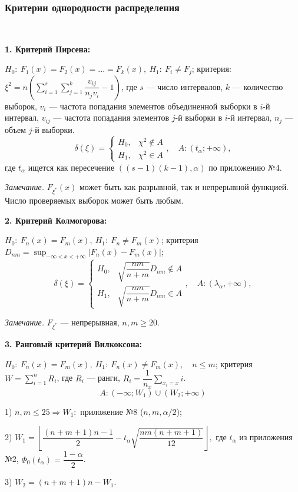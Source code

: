 \documentclass[9pt]{article}
\begin{document}
\subsubsection{Критерии однородности распределения}

\ 
\par\textbf{1. Критерий Пирсена:}
\par\(H_0:\ F_1(x)=F_2(x)=...=F_k(x),\ H_1:\ F_i\neq F_j\);
 критерия: \(\xi^2=n\left(\displaystyle\sum_{i=1}^s\sum_{j=1}^k\dfrac{v_{ij}}{n_jv_i}-1\right)\), где \(s\) --- число интервалов, \(k\) --- количество выборок, \(v_i\) --- частота попадания элементов объединенной выборки в \(i\)-й интервал, \(v_{ij}\) --- частота попадания элементов \(j\)-й выборки в \(i\)-й интервал, \(n_j\) --- объем \(j\)-й выборки.
\[\delta(\xi)=\left\{\begin{array}{ll}
    H_0, & \chi^2\notin A \\
    H_1, & \chi^2\in A
\end{array}\right.,\quad A:(t_\alpha;+\infty),\]
где \(t_\alpha\) ищется как пересечение \(((s-1)(k-1),\alpha)\) по приложению №4.
\par\textit{Замечание.} \(F_{\xi^*}(x)\) может быть как разрывной, так и непрерывной функцией. Число проверяемых выборок может быть любым.
\par\textbf{2. Критерий Колмогорова:}
\par\(H_0:\ F_n(x)=F_m(x),\ H_1:\ F_n\neq F_m(x)\);
 критерия \(D_{nm}=\displaystyle\sup_{-\infty<x<+\infty}|F_n(x)-F_m(x)|\);
\[\delta(\xi)=\left\{\begin{array}{ll}
    H_0, & \sqrt{\dfrac{nm}{n+m}}D_{nm}\notin A \\
    H_1, & \sqrt{\dfrac{nm}{n+m}}D_{nm}\in A
\end{array}
\right.,\quad A:(\lambda_\alpha,+\infty),\]
\par\textit{Замечание.} \(F_{\xi^*}\) --- непрерывная, \(n,m\ge20\).
\par\textbf{3. Ранговый критерий Вилкоксона:}
\par\(H_0:\ F_n(x)=F_m(x),\ H_1:\ F_n(x)\neq F_m(x),\quad n\le m\);
\parСтатистика критерия \(W=\displaystyle\sum_{i=1}^nR_i\), где \(R_i\) --- ранги, \(R_i=\displaystyle\dfrac{1}{n_x}\sum_{x_i=x}i\).
\[A:(-\infty;W_1)\cup(W_2;+\infty)\]
\par1) \(n,m\le25\Rightarrow W_1:\) приложение №8 (\(n,m,\alpha/2\));
\par2) \(W_1=\left\lfloor\dfrac{(n+m+1)n-1}{2}-t_\alpha\sqrt{\dfrac{nm(n+m+1)}{12}}\right\rfloor,\) где \(t_\alpha\) из приложения №2, \(\Phi_0(t_\alpha)=\dfrac{1-\alpha}{2}\).
\par3) \(W_2=(n + m + 1)n-W_1\).
\end{document}
